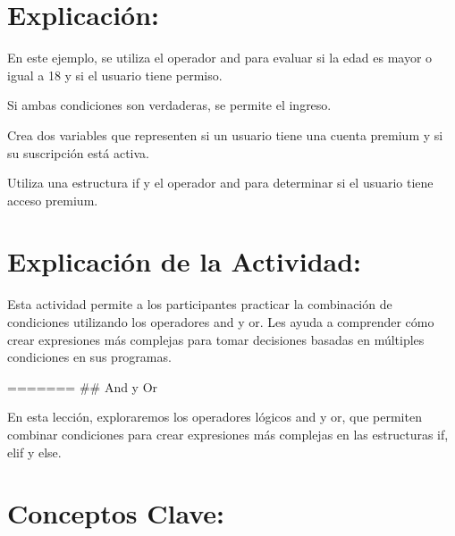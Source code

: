 \documentclass[
  a4paper,
  DIV=11,
  numbers=noendperiod,
  onepage,
  openany]{scrreprt}
\begin{document}
\hypertarget{explicaciuxf3n-34}{%
\section{Explicación:}\label{explicaciuxf3n-34}}

En este ejemplo, se utiliza el operador and para evaluar si la edad es
mayor o igual a 18 y si el usuario tiene permiso.

Si ambas condiciones son verdaderas, se permite el ingreso.

\begin{tcolorbox}[enhanced jigsaw, colbacktitle=quarto-callout-important-color!10!white, toprule=.15mm, leftrule=.75mm, titlerule=0mm, opacityback=0, rightrule=.15mm, opacitybacktitle=0.6, breakable, left=2mm, coltitle=black, title=\textcolor{quarto-callout-important-color}{\faExclamation}\hspace{0.5em}{Actividad Práctica:}, toptitle=1mm, bottomtitle=1mm, arc=.35mm, bottomrule=.15mm, colback=white, colframe=quarto-callout-important-color-frame]

Crea dos variables que representen si un usuario tiene una cuenta
premium y si su suscripción está activa.

Utiliza una estructura if y el operador and para determinar si el
usuario tiene acceso premium.

\end{tcolorbox}

\hypertarget{explicaciuxf3n-de-la-actividad-32}{%
\section{Explicación de la
Actividad:}\label{explicaciuxf3n-de-la-actividad-32}}

Esta actividad permite a los participantes practicar la combinación de
condiciones utilizando los operadores and y or. Les ayuda a comprender
cómo crear expresiones más complejas para tomar decisiones basadas en
múltiples condiciones en sus programas.

======= \#\# And y Or

En esta lección, exploraremos los operadores lógicos and y or, que
permiten combinar condiciones para crear expresiones más complejas en
las estructuras if, elif y else.

\hypertarget{conceptos-clave-35}{%
\section{Conceptos Clave:}\label{conceptos-clave-35}}
\end{document}
